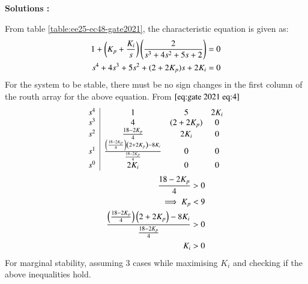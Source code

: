 \documentclass[journal,12pt,onecolumn]{IEEEtran}
\theoremstyle{remark}
\begin{document}
\textbf{Solutions :}
    
    From table \ref{table:ee25-ec48-gate2021}, the characteristic equation is given as:
    \begin{align}
        1+\left(K_p+\frac{K_i}{s}\right)\left(\frac{2}{s^3+4s^2+5s+2}\right) &= 0\\
        s^4+4s^3+5s^2+(2+2K_p)s+2K_i &=0 \label{eq:gate 2021 eq:4}
    \end{align}
    For the system to be stable, there must be no sign changes in the first column of the routh array for the above equation. From $\eqref{eq:gate 2021 eq:4}$
    \begin{align}
    \begin{array}{c|cccc}
        s^4 & 1 & 5 & 2K_i \\
        s^3 & 4 & (2 + 2K_p) & 0 \\
        s^2 & \frac{18-2K_p}{4} & 2K_i & 0 \\
        s^1 &  \frac{\left(\frac{18-2K_p}{4}\right)\left(2 + 2K_p\right)-8K_i}{\frac{18-2K_p}{4}} & 0 & 0\\
        s^0 & 2K_i &0 &0 \\
        \end{array}\\
        \end{align}
        \begin{align}
            \frac{18-2K_p}{4} &> 0\\
            \implies K_p &< 9 \label{eq:gate 2021 eq:1}\\
            \frac{\left(\frac{18-2K_p}{4}\right)\left(2 + 2K_p\right)-8K_i}{\frac{18-2K_p}{4}} &> 0\label{eq:gate 2021 eq:2}\\
        K_i &>0 \label{eq:gate 2021 eq:3}
    \end{align}
    For marginal stability, assuming 3 cases while maximising $K_i$ and checking if the above inequalities hold.
\end{document}

